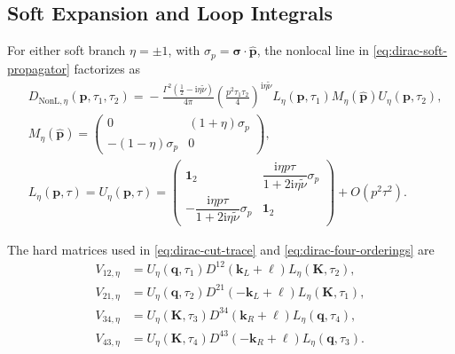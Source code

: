 \documentclass[a4paper,12pt]{article}
\newcommand{\ii}{\mathrm i}
\newcommand{\mb}{\mathbf}
\newcommand{\tn}{\tilde\nu}
\newcommand{\NL}{\mathrm{NonL}}
\begin{document}
\subsection{Soft Expansion and Loop Integrals}
\label{app:dirac-expansion}
For either soft branch $\eta=\pm1$, with
$\sigma_p=\bm\sigma\cdot\widehat{\mb p}$, the nonlocal line in
\eqref{eq:dirac-soft-propagator} factorizes as
\begin{align}
 &D_{\NL,\eta}(\mb p,\tau_1,\tau_2)
 ={}-\frac{\Gamma^2(\tfrac12-\ii\eta\tn)}{4\pi}
 \left(\frac{p^2\tau_1\tau_2}{4}\right)^{\ii\eta\tn}
 L_\eta(\mb p,\tau_1)M_\eta(\widehat{\mb p})
 U_\eta(\mb p,\tau_2),\nonumber\\
 &M_\eta(\widehat{\mb p})=
 \begin{pmatrix}
 0&(1+\eta)\sigma_p\\
 -(1-\eta)\sigma_p&0
 \end{pmatrix},\nonumber\\
 &L_\eta(\mb p,\tau)=U_\eta(\mb p,\tau)=
 \begin{pmatrix}
 \mathbf1_2&\dfrac{\ii\eta p\tau}{1+2\ii\eta\tn}\sigma_p\\[2mm]
 -\dfrac{\ii\eta p\tau}{1+2\ii\eta\tn}\sigma_p&\mathbf1_2
 \end{pmatrix}
 +O(p^2\tau^2).
 \label{eq:dirac-endpoint-factorization}
\end{align}


The hard matrices used in \eqref{eq:dirac-cut-trace} and
\eqref{eq:dirac-four-orderings} are
\begin{align}
 V_{12,\eta}&=U_\eta(\mb q,\tau_1)
 D^{12}(\mb k_L+\bm\ell)L_\eta(\mb K,\tau_2),\nonumber\\
 V_{21,\eta}&=U_\eta(\mb q,\tau_2)
 D^{21}(-\mb k_L+\bm\ell)L_\eta(\mb K,\tau_1),\nonumber\\
 V_{34,\eta}&=U_\eta(\mb K,\tau_3)
 D^{34}(\mb k_R+\bm\ell)L_\eta(\mb q,\tau_4),\nonumber\\
 V_{43,\eta}&=U_\eta(\mb K,\tau_4)
 D^{43}(-\mb k_R+\bm\ell)L_\eta(\mb q,\tau_3).
 \label{eq:dirac-hard-blocks}
\end{align}
\end{document}
